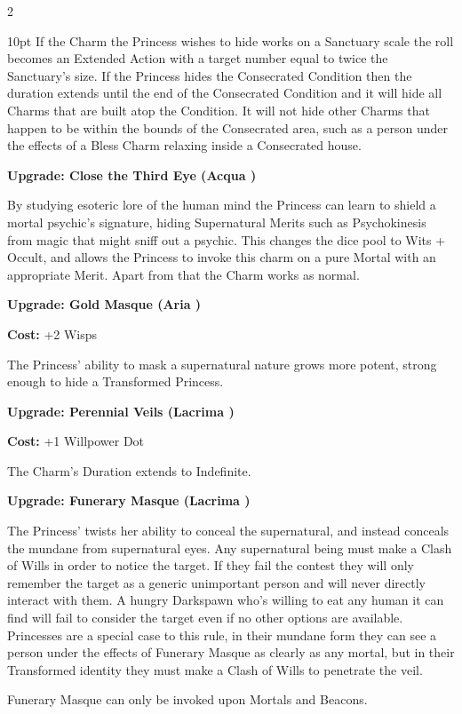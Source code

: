 \begin{multicols}{2}
\begin{myindentpar}{10pt}
If the Charm the Princess wishes to hide works on a Sanctuary scale the roll becomes an Extended Action with a target number equal to twice the Sanctuary's size. If the Princess hides the Consecrated Condition then the duration extends until the end of the Consecrated Condition and it will hide all Charms that are built atop the Condition. It will not hide other Charms that happen to be within the bounds of the Consecrated area, such as a person under the effects of a Bless Charm relaxing inside a Consecrated house. 

\textbf{Upgrade: Close the Third Eye (Acqua \textbullet\textbullet)}

By studying esoteric lore of the human mind the Princess can learn to shield a mortal psychic's signature, hiding Supernatural Merits such as Psychokinesis from magic that might sniff out a psychic. This changes the dice pool to Wits + Occult, and allows the Princess to invoke this charm on a pure Mortal with an appropriate Merit. Apart from that the Charm works as normal.  

\textbf{Upgrade: Gold Masque (Aria \textbullet\textbullet)}

\textbf{Cost:} +2 Wisps

The Princess' ability to mask a supernatural nature grows more potent, strong enough to hide a Transformed Princess. 

\textbf{Upgrade: Perennial Veils (Lacrima \textbullet\textbullet\textbullet)}

\textbf{Cost:} +1 Willpower Dot

The Charm's Duration extends to Indefinite.

\textbf{Upgrade: Funerary Masque (Lacrima \textbullet\textbullet\textbullet\textbullet)}

The Princess' twists her ability to conceal the supernatural, and instead conceals the mundane from supernatural eyes. Any supernatural being must make a Clash of Wills in order to notice the target. If they fail the contest they will only remember the target as a generic unimportant person and will never directly interact with them. A hungry Darkspawn who's willing to eat any human it can find will fail to consider the target even if no other options are available. Princesses are a special case to this rule, in their mundane form they can see a person under the effects of Funerary Masque as clearly as any mortal, but in their Transformed identity they must make a Clash of Wills to penetrate the veil. 

Funerary Masque can only be invoked upon Mortals and Beacons. 


\end{myindentpar}
\end{multicols}

